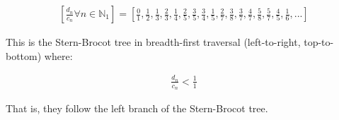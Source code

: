 \documentclass{article}
\begin{document}
\begin{displaymath}\begin{aligned}
\left[
\frac{d_n}{c_n} \forall n \in \mathbb{N}_1
\right]
=
\left[
\frac{0}{1},
\frac{1}{2},
\frac{1}{3},
\frac{2}{3},
\frac{1}{4},
\frac{2}{5},
\frac{3}{5},
\frac{3}{4},
\frac{1}{5},
\frac{2}{7},
\frac{3}{8},
\frac{3}{7},
\frac{4}{7},
\frac{5}{8},
\frac{5}{7},
\frac{4}{5},
\frac{1}{6},
...
\right]
\end{aligned}\end{displaymath}

\noindent
This is the Stern-Brocot tree in breadth-first traversal (left-to-right,
top-to-bottom) where:

\begin{displaymath}\begin{aligned}
\frac{d_n}{c_n} < \frac{1}{1}
\end{aligned}\end{displaymath}

\noindent
That is, they follow the left branch of the Stern-Brocot tree.
\end{document}
